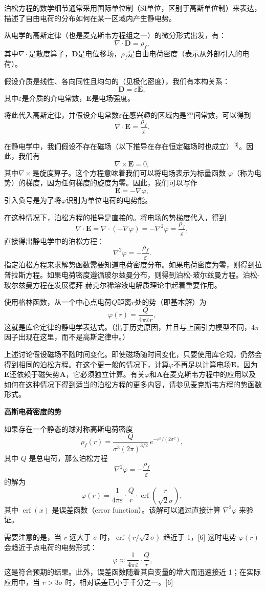 泊松方程的数学细节通常采用国际单位制（SI单位，区别于高斯单位制）来表达，描述了自由电荷的分布如何在某一区域内产生静电势。

从电学的高斯定律（也是麦克斯韦方程组之一）的微分形式出发，有：
\[
\nabla \cdot \mathbf{D} = \rho_f,~
\]
其中\(\nabla \cdot\)是散度算子，\(\mathbf{D}\)是电位移场，\(\rho_f\)是自由电荷密度（表示从外部引入的电荷）。

假设介质是线性、各向同性且均匀的（见极化密度），我们有本构关系：
\[
\mathbf{D} = \varepsilon \mathbf{E},~
\]
其中\(\varepsilon\)是介质的介电常数，\(\mathbf{E}\)是电场强度。

将此代入高斯定律，并假设介电常数\(\varepsilon\)在感兴趣的区域内是空间常数，可以得到  
\[
\nabla \cdot \mathbf{E} = \frac{\rho_f}{\varepsilon}.~
\]

在静电学中，我们假设不存在磁场（以下推导在存在恒定磁场时也成立）\(^\text{[3]}\)。因此，我们有  
\[
\nabla \times \mathbf{E} = 0,~
\]  
其中\(\nabla \times\)是旋度算子。这个方程意味着我们可以将电场表示为标量函数 \(\varphi\)（称为电势）的梯度，因为任何梯度的旋度为零。因此，我们可以写作  
\[
\mathbf{E} = -\nabla \varphi,~
\]  
引入负号是为了将\(\varphi\)识别为单位电荷的电势能。

在这种情况下，泊松方程的推导是直接的。将电场的势梯度代入，得到  
\[
\nabla \cdot \mathbf{E} = \nabla \cdot (-\nabla \varphi) = -\nabla^2 \varphi = \frac{\rho_f}{\varepsilon},~
\]  
直接得出静电学中的泊松方程：
\[
\nabla^2 \varphi = -\frac{\rho_f}{\varepsilon}.~
\]
指定泊松方程来求解势函数需要知道电荷密度分布。如果电荷密度为零，则得到拉普拉斯方程。如果电荷密度遵循玻尔兹曼分布，则得到泊松-玻尔兹曼方程。泊松-玻尔兹曼方程在发展德拜-赫克尔稀溶液电解质理论中起着重要作用。

使用格林函数，从一个中心点电荷\(Q\)距离\(r\)处的势（即基本解）为  
\[
\varphi(r) = \frac{Q}{4\pi \varepsilon r},~
\]  
这就是库仑定律的静电学表达式。（出于历史原因，并且与上面引力模型不同，\(4\pi\)因子出现在这里，而不是高斯定律中。）

上述讨论假设磁场不随时间变化。即使磁场随时间变化，只要使用库仑规，仍然会得到相同的泊松方程。在这个更一般的情况下，计算\(\varphi\)不再足以计算电场\(\mathbf{E}\)，因为\(\mathbf{E}\)还依赖于磁矢势\(\mathbf{A}\)，它必须独立计算。有关\(\varphi\)和\(\mathbf{A}\)在麦克斯韦方程中的应用以及如何在这种情况下得到适当的泊松方程的更多内容，请参见麦克斯韦方程的势函数形式。

\textbf{高斯电荷密度的势}

如果存在一个静态的球对称高斯电荷密度  
\[
\rho_f(r) = \frac{Q}{\sigma^3 (2\pi)^{3/2}}\, e^{-r^2 / (2\sigma^2)},~
\]  
其中 \(Q\) 是总电荷，那么泊松方程  
\[
\nabla^2 \varphi = -\frac{\rho_f}{\varepsilon}~
\]  
的解为  
\[
\varphi(r) = \frac{1}{4\pi \varepsilon} \cdot \frac{Q}{r} \cdot \operatorname{erf} \left( \frac{r}{\sqrt{2}\sigma} \right),~
\]  
其中 \(\operatorname{erf}(x)\) 是误差函数（error function）。该解可以通过直接计算 \(\nabla^2 \varphi\) 来验证。

需要注意的是，当 \(r\) 远大于 \(\sigma\) 时，\(\operatorname{erf}(r / \sqrt{2} \sigma)\) 趋近于 1，[6] 这时电势 \(\varphi(r)\) 会趋近于点电荷的电势形式：
\[
\varphi \approx \frac{1}{4\pi \varepsilon} \cdot \frac{Q}{r},
\]  
这是符合预期的结果。此外，误差函数随着其自变量的增大而迅速接近 1；在实际应用中，当 \(r > 3\sigma\) 时，相对误差已小于千分之一。[6]